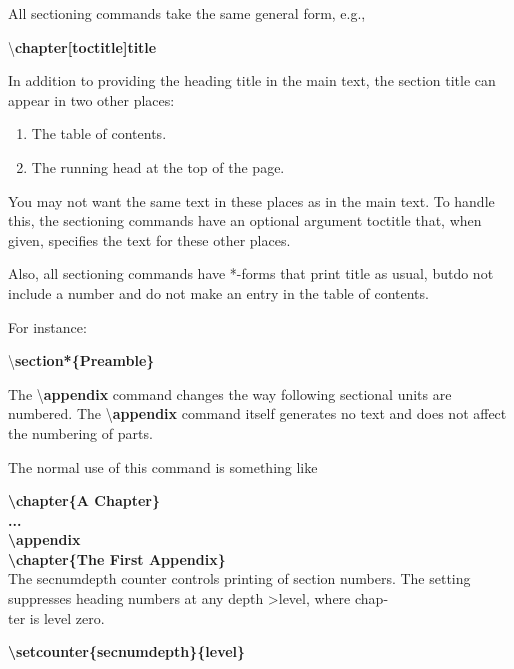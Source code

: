 \documentclass[11pt,a4paper]{article}
\begin{document}
All sectioning commands take the same general form, e.g.,
\begin{center}
\textbackslash \textbf{{\Large chapter[toctitle]{title}}}
\end{center}
In addition to providing the heading title in the main text, the section
title can appear in two other places:

\begin{enumerate}
\item The table of contents.
\item The running head at the top of the page.
\end{enumerate}

You may not want the same text in these places as in the main text.
To handle this, the sectioning commands have an optional argument
toctitle that, when given, specifies the text for these other places.

Also, all sectioning commands have *-forms that print title as usual,
butdo not include a number and do not make an entry in the table of
contents.

For instance:
\begin{center}
\textbackslash \textbf{{\Large section*\{Preamble\}}}
\end{center}
The \textbackslash \textbf{appendix} command changes the way following sectional units
are numbered. The \textbackslash \textbf{appendix} command itself generates no text and
does not affect the numbering of parts.


The normal use of this command is something like
\\
\newline

\textbf{{\Large \qquad \textbackslash chapter\{A Chapter\}}} \\

\textbf{{\Large  \qquad ...}} \\

\textbf{{\Large  \qquad \textbackslash appendix}} \\

\textbf{{\Large  \qquad \textbackslash chapter\{The First Appendix\}}} \\


The secnumdepth counter controls printing of section numbers. The
setting suppresses heading numbers at any depth \textgreater level, where chap-\\
ter is level zero.

\bigskip
\textbf{{\Large \qquad \textbackslash setcounter\{secnumdepth\}\{level\}}} \\
\end{document}
